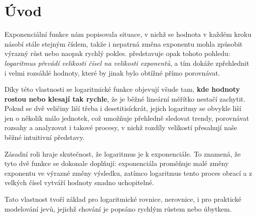 \documentclass[12pt,a4paper]{article}
\begin{document}
\section{Úvod}

Exponenciální funkce nám popisovala situace, v nichž se hodnota v každém kroku násobí stále stejným číslem, 
takže i nepatrná změna exponentu mohla způsobit výrazný růst nebo naopak rychlý pokles. 
 představuje opak tohoto pohledu:
\textit{logaritmus převádí velikosti čísel na velikosti exponentů}, 
a tím dokáže zpřehlednit i velmi rozsáhlé hodnoty, které by jinak bylo obtížné přímo porovnávat.

\smallskip
Díky této vlastnosti se logaritmické funkce objevují všude tam, 
\textbf{kde hodnoty rostou nebo klesají tak rychle}, 
že je běžné lineární měřítko nestačí zachytit. 
Pokud se dvě veličiny liší třeba i desetitisíckrát, 
jejich logaritmy se obvykle liší jen o několik málo jednotek, 
což umožňuje přehledně sledovat trendy, porovnávat rozsahy
a analyzovat i takové procesy, v nichž rozdíly velikostí přesahují naše běžné intuitivní představy.

\smallskip
Zásadní roli hraje skutečnost, že logaritmus je  k exponenciále. 
To znamená, že tyto dvě funkce se dokonale doplňují: 
exponenciála proměňuje malé změny exponentu ve výrazné změny výsledku, 
zatímco logaritmus tento proces obrací a z velkých čísel vytváří hodnoty snadno uchopitelné. 

\smallskip
Tato vlastnost tvoří základ pro logaritmické rovnice, nerovnice, 
i pro praktické modelování jevů, jejichž chování je popsáno rychlým růstem nebo úbytkem.

\begin{center}
\end{center}
\end{document}
